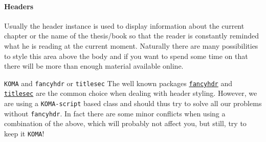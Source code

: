 \paragraph{Headers} Usually the header instance is used to display information about the 
current chapter or the name of the thesis/book so that the reader is constantly reminded 
what he is reading at the current moment. Naturally there are many possibilities to style 
this area above the body and if you want to spend some time on that there will be more 
than enough material available online.
\begin{memo}{\texttt{KOMA} and \texttt{fancyhdr} or \texttt{titlesec}}{}
The well known packages 
\href{https://ctan.org/pkg/fancyhdr}{\texttt{fancyhdr}} and
\href{https://ctan.org/pkg/titlesec}{\texttt{titlesec}} are the common choice 
when dealing with header styling. However, we are using a \texttt{KOMA-script} 
based class and should thus try to solve all our problems without \texttt{fancyhdr}. 
In fact there are some minor conflicts when using  a combination of the above, which will 
probably not affect you, but still, try to keep it \texttt{KOMA}!
\end{memo} 






